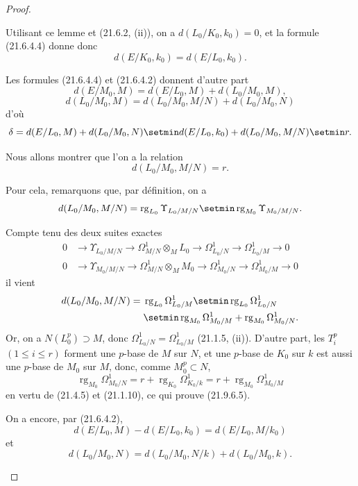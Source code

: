 \begin{proof}
\begin{enumerate}
  Utilisant ce lemme et (21.6.2, (ii)), on a $d(L_0/K_0,k_0)=0$, et la
  formule (21.6.4.4) donne donc
  \[
    d(E/K_0,k_0)=d(E/L_0,k_0).
  \]

  Les formules (21.6.4.4) et (21.6.4.2) donnent d'autre part
  \[
    d(E/M_0,M)=d(E/L_0,M)+d(L_0/M_0,M),
  \]
  \[
    d(L_0/M_0,M)=d(L_0/M_0,M/N)+d(L_0/M_0,N)
  \]
  d'où
  \[
    \delta=d(E/L_0,M)+d(L_0/M_0,N)\setmin d(E/L_0,k_0)
    +d(L_0/M_0,M/N)\setmin r.
  \]

  Nous allons montrer que l'on a la relation
  \begin{equation}
  \tag{21.9.6.5}
  \label{0.21.9.6.5-fr}
    d(L_0/M_0,M/N)=r.
  \end{equation}

  Pour cela, remarquons que, par définition, on a
  \[
    d(L_0/M_0,M/N)
    =\operatorname{rg}_{L_0}\Upsilon_{L_0/M/N}
    \setmin\operatorname{rg}_{M_0}\Upsilon_{M_0/M/N}.
  \]

  Compte tenu des deux suites exactes
  \[
  \begin{aligned}
    0&\longrightarrow\Upsilon_{L_0/M/N}
      \longrightarrow\Omega^1_{M/N}\otimes_ML_0
      \longrightarrow\Omega^1_{L_0/N}
      \longrightarrow\Omega^1_{L_0/M}\longrightarrow0\\
    0&\longrightarrow\Upsilon_{M_0/M/N}
      \longrightarrow\Omega^1_{M/N}\otimes_MM_0
      \longrightarrow\Omega^1_{M_0/N}
      \longrightarrow\Omega^1_{M_0/M}\longrightarrow0
  \end{aligned}
  \]
  il vient
  \[
  \begin{split}
    d(L_0/M_0,M/N)={}&\operatorname{rg}_{L_0}\Omega^1_{L_0/M}
      \setmin\operatorname{rg}_{L_0}\Omega^1_{L_0/N}\\
      &\setmin\operatorname{rg}_{M_0}\Omega^1_{M_0/M}
      +\operatorname{rg}_{M_0}\Omega^1_{M_0/N}.
  \end{split}
  \]
  Or, on a $N(L_0^p)\supset M$, donc
  $\Omega^1_{L_0/N}=\Omega^1_{L_0/M}$ (21.1.5, (ii)). D'autre part, les
  $T_i^p$ $(1\leqslant i\leqslant r)$ forment une $p$-base de $M$ sur $N$,
  et une $p$-base de $K_0$ sur $k$ est aussi une $p$-base de $M_0$ sur $M$,
  donc, comme $M_0^p\subset N$,
  \[
    \operatorname{rg}_{M_0}\Omega^1_{M_0/N}
    =r+\operatorname{rg}_{K_0}\Omega^1_{K_0/k}
    =r+\operatorname{rg}_{M_0}\Omega^1_{M_0/M}
  \]
  en vertu de (21.4.5) et (21.1.10), ce qui prouve (21.9.6.5).

  On a encore, par (21.6.4.2),
  \[
    d(E/L_0,M)-d(E/L_0,k_0)=d(E/L_0,M/k_0)
  \]
  et
  \[
    d(L_0/M_0,N)=d(L_0/M_0,N/k)+d(L_0/M_0,k).
  \]


\end{enumerate}
\end{proof}
